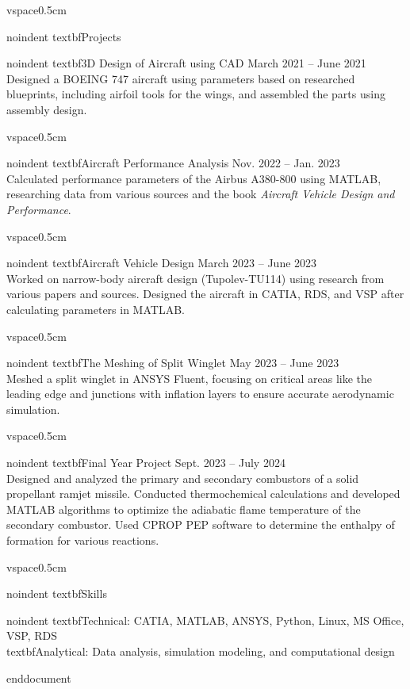 vspace{0.5cm}

noindent
textbf{\large Projects}

noindent
textbf{3D Design of Aircraft using CAD} \hfill March 2021 – June 2021 \\
Designed a BOEING 747 aircraft using parameters based on researched blueprints, including airfoil tools for the wings, and assembled the parts using assembly design.

vspace{0.5cm}

noindent
textbf{Aircraft Performance Analysis} \hfill Nov. 2022 – Jan. 2023 \\
Calculated performance parameters of the Airbus A380-800 using MATLAB, researching data from various sources and the book \textit{Aircraft Vehicle Design and Performance}.

vspace{0.5cm}

noindent
textbf{Aircraft Vehicle Design} \hfill March 2023 – June 2023 \\
Worked on narrow-body aircraft design (Tupolev-TU114) using research from various papers and sources. Designed the aircraft in CATIA, RDS, and VSP after calculating parameters in MATLAB.

vspace{0.5cm}

noindent
textbf{The Meshing of Split Winglet} \hfill May 2023 – June 2023 \\
Meshed a split winglet in ANSYS Fluent, focusing on critical areas like the leading edge and junctions with inflation layers to ensure accurate aerodynamic simulation.

vspace{0.5cm}

noindent
textbf{Final Year Project} \hfill Sept. 2023 – July 2024 \\
Designed and analyzed the primary and secondary combustors of a solid propellant ramjet missile. Conducted thermochemical calculations and developed MATLAB algorithms to optimize the adiabatic flame temperature of the secondary combustor. Used CPROP PEP software to determine the enthalpy of formation for various reactions.

vspace{0.5cm}

noindent
textbf{\large Skills}

noindent
textbf{Technical:} CATIA, MATLAB, ANSYS, Python, Linux, MS Office, VSP, RDS \\
textbf{Analytical:} Data analysis, simulation modeling, and computational design

end{document}
